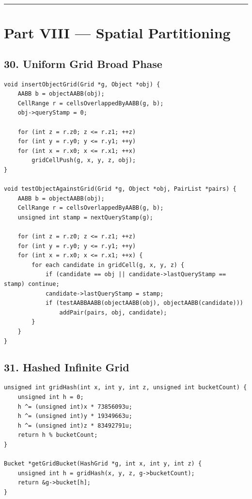\documentclass[10pt,letterpaper]{article}
\begin{document}
\medskip\hrule\medskip


\clearpage
{}
\section*{Part VIII --- Spatial Partitioning}


\subsection*{30. Uniform Grid Broad Phase}

\begin{verbatim}
void insertObjectGrid(Grid *g, Object *obj) {
    AABB b = objectAABB(obj);
    CellRange r = cellsOverlappedByAABB(g, b);
    obj->queryStamp = 0;

    for (int z = r.z0; z <= r.z1; ++z)
    for (int y = r.y0; y <= r.y1; ++y)
    for (int x = r.x0; x <= r.x1; ++x)
        gridCellPush(g, x, y, z, obj);
}

void testObjectAgainstGrid(Grid *g, Object *obj, PairList *pairs) {
    AABB b = objectAABB(obj);
    CellRange r = cellsOverlappedByAABB(g, b);
    unsigned int stamp = nextQueryStamp(g);

    for (int z = r.z0; z <= r.z1; ++z)
    for (int y = r.y0; y <= r.y1; ++y)
    for (int x = r.x0; x <= r.x1; ++x) {
        for each candidate in gridCell(g, x, y, z) {
            if (candidate == obj || candidate->lastQueryStamp == stamp) continue;
            candidate->lastQueryStamp = stamp;
            if (testAABBAABB(objectAABB(obj), objectAABB(candidate)))
                addPair(pairs, obj, candidate);
        }
    }
}
\end{verbatim}


\subsection*{31. Hashed Infinite Grid}

\begin{verbatim}
unsigned int gridHash(int x, int y, int z, unsigned int bucketCount) {
    unsigned int h = 0;
    h ^= (unsigned int)x * 73856093u;
    h ^= (unsigned int)y * 19349663u;
    h ^= (unsigned int)z * 83492791u;
    return h % bucketCount;
}

Bucket *getGridBucket(HashGrid *g, int x, int y, int z) {
    unsigned int h = gridHash(x, y, z, g->bucketCount);
    return &g->bucket[h];
}
\end{verbatim}
\end{document}
